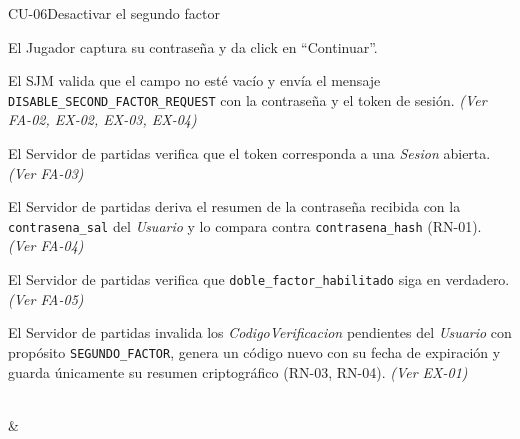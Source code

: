 \begin{fichacu}{CU-06}{Desactivar el segundo factor}
{\begin{cuenum}[start=1]
      \item El Jugador captura su contraseña y da click en ``Continuar''.
      \item El SJM valida que el campo no esté vacío y envía el mensaje \texttt{DISABLE\_\allowbreak{}SECOND\_\allowbreak{}FACTOR\_\allowbreak{}REQUEST} con la contraseña y el token de sesión. \textit{(Ver \mbox{FA-02}, \mbox{EX-02}, \mbox{EX-03}, \mbox{EX-04})}
      \item El Servidor de partidas verifica que el token corresponda a una \textit{Sesion} abierta. \textit{(Ver \mbox{FA-03})}
      \item El Servidor de partidas deriva el resumen de la contraseña recibida con la \texttt{contrasena\_\allowbreak{}sal} del \textit{Usuario} y lo compara contra \texttt{contrasena\_\allowbreak{}hash} (\mbox{RN-01}). \textit{(Ver \mbox{FA-04})}
      \item El Servidor de partidas verifica que \texttt{doble\_\allowbreak{}factor\_\allowbreak{}habilitado} siga en verdadero. \textit{(Ver \mbox{FA-05})}
      \item El Servidor de partidas invalida los \textit{CodigoVerificacion} pendientes del \textit{Usuario} con propósito \texttt{SEGUNDO\_\allowbreak{}FACTOR}, genera un código nuevo con su fecha de expiración y guarda únicamente su resumen criptográfico (\mbox{RN-03}, \mbox{RN-04}). \textit{(Ver \mbox{EX-01})}
    \end{cuenum}} \\
   & 
\end{fichacu}
